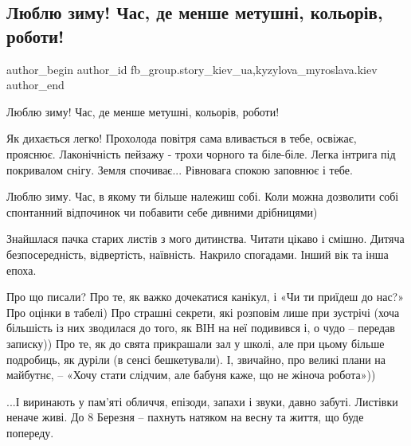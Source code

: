  
 
 
 
 
 
\subsection{Люблю зиму! Час, де менше метушні, кольорів, роботи!}
\label{sec:29_01_2022.fb.fb_group.story_kiev_ua.2.ljublju_zima}
 
\ifcmt
 author_begin
   author_id fb_group.story_kiev_ua,kyzylova_myroslava.kiev
 author_end
\fi

Люблю зиму! Час, де менше метушні, кольорів, роботи!

Як дихається легко! Прохолода повітря сама вливається в тебе, освіжає,
прояснює. Лаконічність пейзажу - трохи чорного та біле-біле. Легка інтрига під
покривалом снігу. Земля спочиває... Рівновага спокою заповнює і тебе.

Люблю зиму. Час, в якому ти більше належиш собі. Коли можна дозволити собі
спонтанний відпочинок чи побавити себе дивними дрібницями) 

Знайшлася пачка старих листів з мого дитинства. Читати цікаво і смішно.
Дитяча безпосередність, відвертість, наївність. Накрило спогадами. Інший вік
та інша епоха.

Про що писали? Про те, як важко дочекатися канікул, і «Чи ти приїдеш до нас?»
Про оцінки в табелі) Про страшні секрети, які розповім лише при зустрічі (хоча
більшість із них зводилася до того, як ВІН на неї подивився і, о чудо – передав
записку)) Про те, як до свята прикрашали зал у школі, але при цьому більше
подробиць, як дуріли (в сенсі бешкетували). І, звичайно, про великі плани на
майбутнє, – «Хочу стати слідчим, але бабуня каже, що не жіноча робота»))

...І виринають у пам’яті обличчя, епізоди, запахи і звуки, давно забуті. Листівки
неначе живі. До 8 Березня – пахнуть натяком на весну та життя, що буде
попереду.

